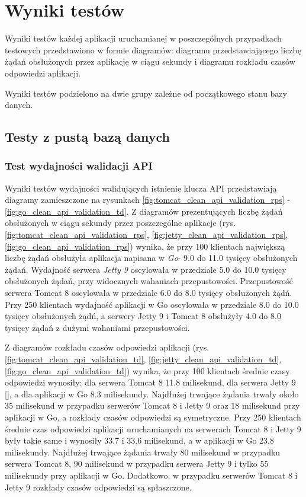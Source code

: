 \chapter{Wyniki testów}
Wyniki testów każdej aplikacji uruchamianej w poszczególnych przypadkach  testowych przedstawiono w formie diagramów: diagramu przedstawiającego liczbę żądań obsłużonych przez aplikację w ciągu sekundy i diagramu rozkładu czasów odpowiedzi aplikacji.

Wyniki testów podzielono na dwie grupy zależne od początkowego stanu bazy danych.

\section{Testy z pustą bazą danych}

\subsection{Test wydajności walidacji API}
Wyniki testów wydajności walidujących istnienie klucza API przedstawiają diagramy zamieszczone na rysunkach \ref{fig:tomcat_clean_api_validation_rps} - \ref{fig:go_clean_api_validation_td}. 
Z diagramów prezentujących liczbę żądań obsłużonych w ciągu sekundy przez poszczególne aplikacje (rys. \ref{fig:tomcat_clean_api_validation_rps}, \ref{fig:jetty_clean_api_validation_rps}, \ref{fig:go_clean_api_validation_rps}) wynika, że przy 100 klientach największą liczbę żądań obsłużyła aplikacja napisana w \textsl{Go}- 9.0 do 11.0 tysięcy obsłużonych żądań. Wydajność serwera \textsl{Jetty 9} oscylowała w przedziale 5.0 do 10.0 tysięcy obsłużonych żądań, przy widocznych wahaniach przepustowości. Przepustowość serwera Tomcat 8 oscylowała w przedziale 6.0 do 8.0 tysięcy obsłużonych żądń.  Przy 250 klientach wydajność aplikacji w Go oscylowała w przedziale 8.0 do 10.0 tysięcy obsłużonych żądń, a serwery Jetty 9 i Tomcat 8 obsłużyły 4.0 do 8.0 tysięcy żądań z dużymi wahaniami przepustowości.      

Z diagramów rozkładu czasów odpowiedzi aplikacji (rys. \ref{fig:tomcat_clean_api_validation_td}, \ref{fig:jetty_clean_api_validation_td}, \ref{fig:go_clean_api_validation_td}) wynika, że przy 100 klientach średnie czasy odpowiedzi wynosiły: dla serwera Tomcat 8 11.8 milisekund, dla serwera Jetty 9 [], a dla aplikacji w Go 8.3 milisekundy. Najdłużej trwające żądania trwały około 35 milisekund w przypadku serwerów Tomcat 8 i Jetty 9 oraz 18 milisekund przy aplikacji w Go, a rozkłady czasów odpowiedzi są symetryczne.  Przy 250 klientach średnie czas odpowiedzi aplikacji uruchamianych na serwerach Tomcat 8 i Jetty 9 były takie same i wynosiły 33.7 i 33.6 milisekund, a w aplikacji w Go 23,8 milisekundy. Najdłużej trwające żądania trwały  80 milisekund w przypadku serwera Tomcat 8, 90 milisekund w przypadku serwera Jetty 9 i tylko 55 milisekundy przy aplikacji w Go. Dodatkowo, w przypadku serwerów Tomcat 8 i Jetty 9 rozkłady czasów odpowiedzi są spłaszczone. 

